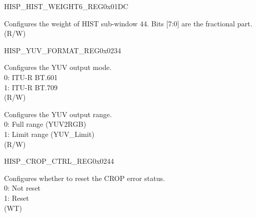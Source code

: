 \begin{register}{H}{ISP\_HIST\_WEIGHT6\_REG}{0x01DC}\label{regdesc:ISPHISTWEIGHT6REG}
%
%
\regnewline%
\begin{regdesc}\begin{reglist}
\label{fielddesc:ISPHISTWEIGHT44}\item [ISP\_HIST\_WEIGHT\_44] Configures the weight of HIST sub-window 44. Bits [7:0] are the fractional part. (R/W)
\end{reglist}\end{regdesc}
\end{register}












\begin{register}{H}{ISP\_YUV\_FORMAT\_REG}{0x0234}\label{regdesc:ISPYUVFORMATREG}
%
%
%
\regnewline%
\begin{regdesc}\begin{reglist}
\label{fielddesc:ISPYUVMODE}\item [ISP\_YUV\_MODE] Configures the YUV output mode.\\0: ITU-R BT.601\\1: ITU-R BT.709\\(R/W)
\label{fielddesc:ISPYUVRANGE}\item [ISP\_YUV\_RANGE] Configures the YUV output range.\\0: Full range (YUV2RGB)\\1: Limit range (YUV\_Limit)\\(R/W)
\end{reglist}\end{regdesc}
\end{register}


\begin{register}{H}{ISP\_CROP\_CTRL\_REG}{0x0244}\label{regdesc:ISPCROPCTRLREG}
%
%
\regnewline%
\begin{regdesc}\begin{reglist}
\label{fielddesc:ISPCROPSFTRST}\item [ISP\_CROP\_SFT\_RST] Configures whether to reset the CROP error status.\\
0: Not reset\\
1: Reset\\(WT)
\end{reglist}\end{regdesc}
\end{register}


